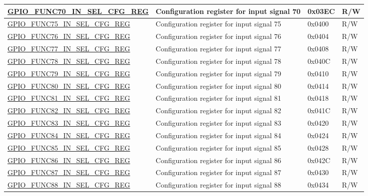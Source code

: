 \begin{longtable}{ | p{5.5cm} | p{7cm} | p{1.3cm} | p{1.9cm} | }
\hyperref[regdesc:GPIOFUNC70INSELCFGREG]{GPIO\_FUNC70\_IN\_SEL\_CFG\_REG} & Configuration register for input signal 70 & 0x03EC & R/W \\ \hline
\hyperref[regdesc:GPIOFUNCTINSELCFGREG]{GPIO\_FUNC75\_IN\_SEL\_CFG\_REG} & Configuration register for input signal 75 & 0x0400 & R/W \\ \hline
\hyperref[regdesc:GPIOFUNCTINSELCFGREG]{GPIO\_FUNC76\_IN\_SEL\_CFG\_REG} & Configuration register for input signal 76 & 0x0404 & R/W \\ \hline
\hyperref[regdesc:GPIOFUNCTINSELCFGREG]{GPIO\_FUNC77\_IN\_SEL\_CFG\_REG} & Configuration register for input signal 77 & 0x0408 & R/W \\ \hline
\hyperref[regdesc:GPIOFUNCTINSELCFGREG]{GPIO\_FUNC78\_IN\_SEL\_CFG\_REG} & Configuration register for input signal 78 & 0x040C & R/W \\ \hline
\hyperref[regdesc:GPIOFUNCTINSELCFGREG]{GPIO\_FUNC79\_IN\_SEL\_CFG\_REG} & Configuration register for input signal 79 & 0x0410 & R/W \\ \hline
\hyperref[regdesc:GPIOFUNCTINSELCFGREG]{GPIO\_FUNC80\_IN\_SEL\_CFG\_REG} & Configuration register for input signal 80 & 0x0414 & R/W \\ \hline
\hyperref[regdesc:GPIOFUNCTINSELCFGREG]{GPIO\_FUNC81\_IN\_SEL\_CFG\_REG} & Configuration register for input signal 81 & 0x0418 & R/W \\ \hline
\hyperref[regdesc:GPIOFUNCTINSELCFGREG]{GPIO\_FUNC82\_IN\_SEL\_CFG\_REG} & Configuration register for input signal 82 & 0x041C & R/W \\ \hline
\hyperref[regdesc:GPIOFUNCTINSELCFGREG]{GPIO\_FUNC83\_IN\_SEL\_CFG\_REG} & Configuration register for input signal 83 & 0x0420 & R/W \\ \hline
\hyperref[regdesc:GPIOFUNCTINSELCFGREG]{GPIO\_FUNC84\_IN\_SEL\_CFG\_REG} & Configuration register for input signal 84 & 0x0424 & R/W \\ \hline
\hyperref[regdesc:GPIOFUNCTINSELCFGREG]{GPIO\_FUNC85\_IN\_SEL\_CFG\_REG} & Configuration register for input signal 85 & 0x0428 & R/W \\ \hline
\hyperref[regdesc:GPIOFUNCTINSELCFGREG]{GPIO\_FUNC86\_IN\_SEL\_CFG\_REG} & Configuration register for input signal 86 & 0x042C & R/W \\ \hline
\hyperref[regdesc:GPIOFUNCTINSELCFGREG]{GPIO\_FUNC87\_IN\_SEL\_CFG\_REG} & Configuration register for input signal 87 & 0x0430 & R/W \\ \hline
\hyperref[regdesc:GPIOFUNCTINSELCFGREG]{GPIO\_FUNC88\_IN\_SEL\_CFG\_REG} & Configuration register for input signal 88 & 0x0434 & R/W \\ \hline

\end{longtable}
